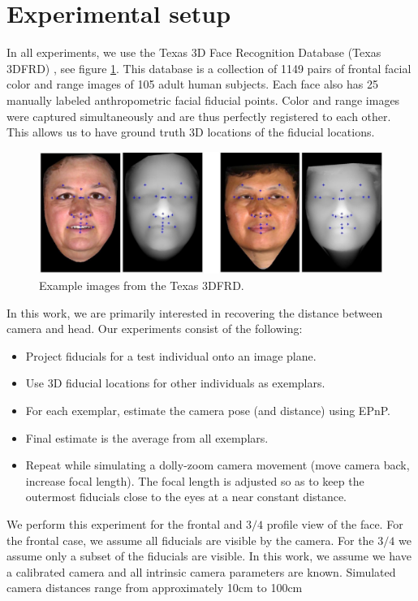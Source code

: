 \documentclass[runningheads]{llncs}
\begin{document}
\section{Experimental setup}
In all experiments, we use the Texas 3D Face Recognition Database (Texas 3DFRD) \cite{gupta2010texas}, see figure \ref{fig:t3dfrd}.  This database is a collection of 1149 pairs of frontal facial color and range images of 105 adult human subjects.  Each face also has 25 manually labeled anthropometric facial fiducial points.  Color and range images were captured simultaneously and are thus perfectly registered to each other.  This allows us to have ground truth 3D locations of the fiducial locations.  
\begin{figure}[h]
\centering
\includegraphics[width=.7\linewidth]{resources/figures/t3dfr.jpg}
\caption{Example images from the Texas 3DFRD.}
\label{fig:t3dfrd}
\end{figure}
In this work, we are primarily interested in recovering the distance between camera and head.  Our experiments consist of the following:

\begin{itemize}
\item Project fiducials for a test individual onto an image plane.
\item Use 3D fiducial locations for other individuals as exemplars.
\item For each exemplar, estimate the camera pose (and distance) using EPnP.
\item Final estimate is the average from all exemplars.
\item Repeat while simulating a dolly-zoom camera movement (move camera back, increase focal length).  The focal length is adjusted so as to keep the outermost fiducials close to the eyes at a near constant distance.
\end{itemize}

We perform this experiment for the frontal and $3/4$ profile view of the face.  For the frontal case, we assume all fiducials are visible by the camera.  For the $3/4$ we assume only a subset of the fiducials are visible. In this work, we assume we have a calibrated camera and all intrinsic camera parameters are known.  Simulated camera distances range from approximately 10cm to 100cm
\end{document}
